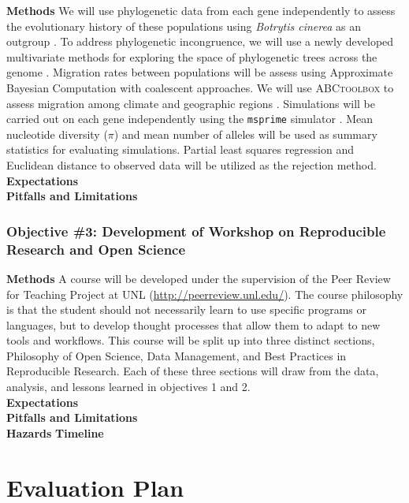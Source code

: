 \documentclass[12pt,letterpaper]{article}
\begin{document}
\noindent \textbf{Methods} We will use phylogenetic data from each gene independently to assess the evolutionary history of these populations using \textit{Botrytis cinerea} as an outgroup \citep{staats2012genome}. 
To address phylogenetic incongruence, we will use a newly developed multivariate methods for exploring the space of phylogenetic trees across the genome \citep{kendall2016mapping, jombart2017treespace}. 
Migration rates between populations will be assess using
Approximate Bayesian Computation with coalescent approaches. We will use \textsc{ABCtoolbox} to assess migration among climate and geographic regions \citep{wegmann2010abctoolbox}. 
Simulations will be carried out on each gene independently using the \texttt{msprime} simulator \citep{kelleher2016efficient}. 
Mean nucleotide diversity ($\pi$) and mean number of alleles will be used as summary statistics for evaluating simulations. 
Partial least squares regression and Euclidean distance to observed data will be utilized as the rejection method.\\
\noindent \textbf{Expectations}\\
\noindent \textbf{Pitfalls and Limitations}\\

\subsubsection{Objective \#3: Development of Workshop on Reproducible Research and Open Science}

\noindent \textbf{Methods} A course will be developed under the supervision of the Peer Review for Teaching Project at UNL (\url{http://peerreview.unl.edu/}). 
The course philosophy is that the student should not necessarily learn to use specific programs or languages, but to develop thought processes that allow them to adapt to new tools and workflows.
This course will be split up into three distinct sections, Philosophy of Open Science, Data Management, and Best Practices in Reproducible Research. 
Each of these three sections will draw from the data, analysis, and lessons learned in objectives 1 and 2.\\
\noindent \textbf{Expectations}\\
\noindent \textbf{Pitfalls and Limitations}\\

\noindent \textbf{Hazards}
\noindent \textbf{Timeline}

\section{Evaluation Plan}
\end{document}
